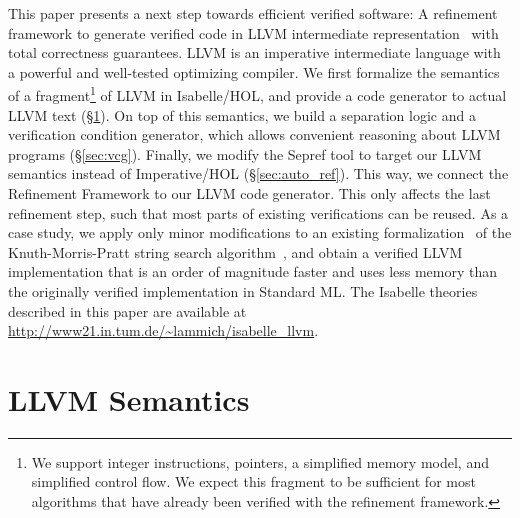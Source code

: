 \documentclass[a4paper,oribibl,envcountsame]{llncs}
\begin{document}
This paper presents a next step towards efficient verified software: A refinement framework to generate verified code in LLVM intermediate representation~\cite{LLVM-manual} 
with total correctness guarantees. LLVM is an imperative intermediate language with a powerful and well-tested optimizing compiler.
We first formalize the semantics of a fragment\footnote{We support integer instructions, pointers, a simplified memory model, and simplified control flow. We expect this fragment to be sufficient for most algorithms that have already been verified with the refinement framework.} of LLVM in Isabelle/HOL, and provide a code generator to actual LLVM text (\S\ref{sec:semantics}). 
On top of this semantics, we build a separation logic and a verification condition generator, which allows convenient reasoning about LLVM programs (\S\ref{sec:vcg}).
Finally, we modify the Sepref tool to target our LLVM semantics instead of Imperative/HOL (\S\ref{sec:auto_ref}). 
This way, we connect the Refinement Framework to our LLVM code generator. This only affects the last refinement step, 
such that most parts of existing verifications can be reused. As a case study, we apply only minor modifications to an existing formalization~\cite{HeLa17} of
the Knuth-Morris-Pratt string search algorithm~\cite{KMP77}, and obtain a verified 
LLVM implementation that is an order of magnitude faster and uses less memory than the originally verified implementation in Standard ML.
The Isabelle theories described in this paper are available at \url{http://www21.in.tum.de/~lammich/isabelle_llvm}. 



\section{LLVM Semantics}\label{sec:semantics}
\end{document}
